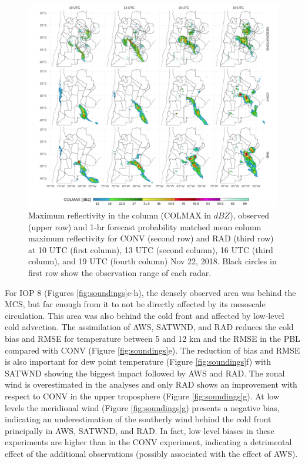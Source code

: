 \documentclass[final,5p,times,twocolumn,authoryear]{elsarticle} %
\begin{document}
\begin{figure}[h]
\includegraphics[width=1\linewidth]{../figures/dbz-mean-1} \caption{Maximum reflectivity in the column (COLMAX in \(dBZ\)), observed (upper row) and 1-hr forecast probability matched mean column maximum reflectivity for CONV (second row) and RAD (third row) at 10 UTC (first column), 13 UTC (second column), 16 UTC (third column), and 19 UTC (fourth column) Nov 22, 2018. Black circles in first row show the observation range of each radar.}\label{fig:dbz-mean}
\end{figure}

For IOP 8 (Figures \ref{fig:soundings}e-h), the densely observed area was behind the MCS, but far enough from it to not be directly affected by its mesoscale circulation. This area was also behind the cold front and affected by low-level cold advection. The assimilation of AWS, SATWND, and RAD reduces the cold bias and RMSE for temperature between 5 and 12 km and the RMSE in the PBL compared with CONV (Figure \ref{fig:soundings}e). The reduction of bias and RMSE is also important for dew point temperature (Figure \ref{fig:soundings}f) with SATWND showing the biggest impact followed by AWS and RAD. The zonal wind is overestimated in the analyses and only RAD shows an improvement with respect to CONV in the upper troposphere (Figure \ref{fig:soundings}g). At low levels the meridional wind (Figure \ref{fig:soundings}g) presents a negative bias, indicating an underestimation of the southerly wind behind the cold front principally in AWS, SATWND, and RAD. In fact, low level biases in these experiments are higher than in the CONV experiment, indicating a detrimental effect of the additional observations (possibly associated with the effect of AWS).
\end{document}
